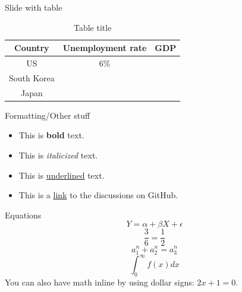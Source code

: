 \documentclass{beamer} %
\begin{document}
\begin{frame}{Slide with table}
    \begin{table}[]
        \centering
        \begin{tabular}{c|c|c} %
           Country  &  Unemployment rate & GDP \\\hline %
            US & 6\% & \\ %
            South Korea & & \\
            Japan & & \\
        \end{tabular}
        \caption{Table title}
    \end{table}
\end{frame}

\begin{frame}{Formatting/Other stuff}
    \begin{itemize}
        \item This is \textbf{bold} text. %
        \item This is \textit{italicized} text. %
        \item This is \underline{underlined} text. %
        \item This is a \href{https://github.com/pmichaillat/unemployment/discussions}{link} to the discussions on GitHub. %
    \end{itemize}
\end{frame}

\begin{frame}{Equations}
    \begin{equation} %
        Y = \alpha + \beta X + \epsilon
    \end{equation}
    \begin{equation*} %
        \frac{3}{6} = \frac{1}{2}
    \end{equation*}
    \begin{equation} 
        a_1^n + a_2^n = a_3^n %
    \end{equation}
    \begin{equation}
        \int_0^\infty f(x) dx %
    \end{equation}
    You can also have math inline by using dollar signs: $2x + 1 = 0$. 
\end{frame}
\end{document}
